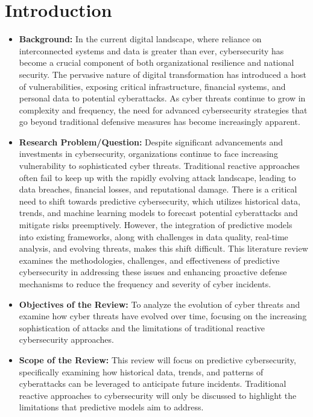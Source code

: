 \documentclass[12pt,a4paper]{article}
\begin{document}
\section{Introduction}
\begin{itemize}
    \item \textbf{Background:} In the current digital landscape, where reliance on interconnected systems and data is greater than ever, cybersecurity has become a crucial component of both organizational resilience and national security. The pervasive nature of digital transformation has introduced a host of vulnerabilities, exposing critical infrastructure, financial systems, and personal data to potential cyberattacks. As cyber threats continue to grow in complexity and frequency, the need for advanced cybersecurity strategies that go beyond traditional defensive measures has become increasingly apparent.
    \item \textbf{Research Problem/Question:} Despite significant advancements and investments in cybersecurity, organizations continue to face increasing vulnerability to sophisticated cyber threats. Traditional reactive approaches often fail to keep up with the rapidly evolving attack landscape, leading to data breaches, financial losses, and reputational damage. There is a critical need to shift towards predictive cybersecurity, which utilizes historical data, trends, and machine learning models to forecast potential cyberattacks and mitigate risks preemptively. However, the integration of predictive models into existing frameworks, along with challenges in data quality, real-time analysis, and evolving threats, makes this shift difficult. This literature review examines the methodologies, challenges, and effectiveness of predictive cybersecurity in addressing these issues and enhancing proactive defense mechanisms to reduce the frequency and severity of cyber incidents.
    \item \textbf{Objectives of the Review:} To analyze the evolution of cyber threats and examine how cyber threats have evolved over time, focusing on the increasing sophistication of attacks and the limitations of traditional reactive cybersecurity approaches.
    \item \textbf{Scope of the Review:} This review will focus on predictive cybersecurity, specifically examining how historical data, trends, and patterns of cyberattacks can be leveraged to anticipate future incidents. Traditional reactive approaches to cybersecurity will only be discussed to highlight the limitations that predictive models aim to address.
\end{itemize}
\end{document}
